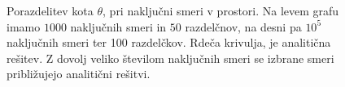 \documentclass[slovene,11pt,a4paper]{article}
\numberwithin{equation}{section} %
\numberwithin{figure}{section} %
\numberwithin{table}{section} %
\begin{document}
\begin{figure}[h]
\noindent{}
\caption{Porazdelitev kota $\theta$, pri naključni smeri v prostori. Na levem grafu imamo $1000$ naključnih smeri in $50$ razdelčnov, na desni pa $10^{5}$ naključnih smeri ter 100 razdelčkov. Rdeča krivulja, je analitična rešitev. Z dovolj veliko številom naključnih smeri se izbrane smeri približujejo analitični rešitvi.}
\end{figure}
\end{document}
